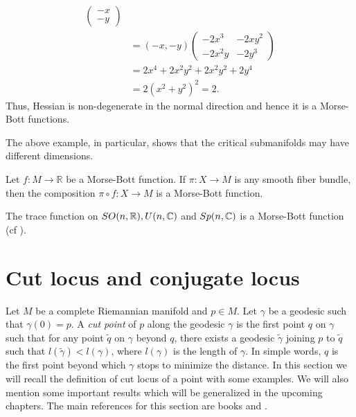 \begin{eg}
\begin{align*}
\begin{pmatrix}
            -x\\-y
        \end{pmatrix} \\[1ex]
        & = (-x,-y) 
        \begin{pmatrix}
            -2x^3 & -2xy^2 \\ -2x^2y & -2y^3    
        \end{pmatrix} \\[1ex]
        & = 2x^4+2x^2y^2+2x^2y^2+2y^4 \\
        & = 2 \left(x^2+y^2\right)^2 = 2.
    \end{align*}
    Thus, Hessian is non-degenerate in the normal direction and hence it is a Morse-Bott functions.
\end{eg}
\begin{rem}
    The above example, in particular, shows that the critical submanifolds may have different dimensions.
\end{rem}

\begin{eg}
    Let $f:M\to \mathbb{R}$ be a Morse-Bott function. If $\pi:X\to M$ is any smooth fiber bundle, then the composition $\pi\circ f:X\to M$ is a Morse-Bott function. 
\end{eg}
\bigskip
\noindent The trace function on $SO(n,\mathbb{R}), U(n,\mathbb{C})$ and $Sp(n,\mathbb{C})$ is a Morse-Bott function (cf \cite[page~90, Exercise~22]{BaHu04}).

\section{Cut locus and conjugate locus}\label{Sec:cutLocusOfPoint}
\hfb Let $M$ be a complete Riemannian manifold and $p\in M$. Let $\gamma$ be a geodesic such that $\gamma(0)=p$. A \textit{cut point} of $p$ along the geodesic $\gamma$ is the first point $q$ on $\gamma$ such that for any point $\tilde{q}$ on $\gamma$ beyond $q$, there exists a geodesic $\tilde{\gamma}$ joining $p$ to $\tilde{q}$ such that $l \left(\tilde{\gamma}\right)<l(\gamma)$, where $l(\gamma)$ is the length of $\gamma$. In simple words, $q$ is the first point beyond which $\gamma$ stops to minimize the distance. In this section we will recall the definition of cut locus of a point with some examples. We will also mention some important results which will be generalized in the upcoming chapters. The main references for this section are books \cite[Chapter 3, Section 4]{Sak96} and \cite[Chapter 5]{ChEb75}.

